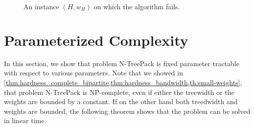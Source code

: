 \documentclass[runningheads]{llncs}
\newcommand{\xxxNTP}{{\sc N-TreePack}}
\newcommand{\greedy}{\text{\sf Greedy}}
\begin{document}
\begin{figure}[tbh]
\bigskip
\begin{center}
\end{center}
\caption{An instance $(H,w_H)$ on which the {\greedy} algorithm fails.}
\label{fig:cactus}
\end{figure}



\section{Parameterized Complexity}
\label{sec:parameterized}
In this section, we show that problem {\xxxNTP} is fixed parameter tractable with 
respect to various parameters. 
Note that we showed in \cref{thm:hardness_complete_bipartite,thm:hardness_bandwidth,th:small-weights}, 
that problem {\xxxNTP} is NP-complete, even if either the treewidth or the weights are bounded by a constant. 
If on the other hand both treedwidth and weights are bounded, the following theorem shows that 
the problem can be solved in linear time.
\end{document}
